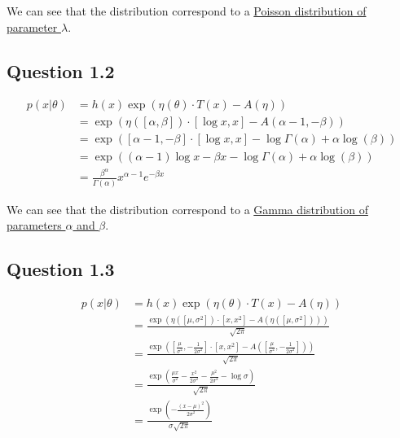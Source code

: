 \documentclass{article}
\begin{document}
We can see that the distribution correspond to a \underline{Poisson distribution of parameter $\lambda$}.

\subsection*{Question 1.2}

\begin{equation}
    \begin{split}
        p(x|\theta) & = h(x) \exp(\eta(\theta) \cdot T(x) - A(\eta))                                            \\
                    & = \exp(\eta([\alpha, \beta]) \cdot [\log x, x] - A(\alpha - 1, -\beta))                   \\
                    & = \exp([\alpha - 1, -\beta] \cdot [\log x, x] - \log \Gamma(\alpha) + \alpha \log(\beta)) \\
                    & = \exp((\alpha - 1) \log x - \beta x - \log \Gamma(\alpha) + \alpha \log(\beta))          \\
                    & = \frac{\beta^\alpha}{\Gamma(\alpha)} x^{\alpha - 1} e^{-\beta x}
    \end{split}
\end{equation}

We can see that the distribution correspond to a \underline{Gamma distribution of parameters $\alpha$ and $\beta$}.

\subsection*{Question 1.3}

\begin{equation}
    \begin{split}
        p(x|\theta) & = h(x) \exp(\eta(\theta) \cdot T(x) - A(\eta))                                                                                                 \\
                    & = \frac{\exp(\eta([\mu, \sigma^2]) \cdot [x, x^2] - A(\eta([\mu, \sigma^2])))}{\sqrt{2 \pi}}                                                   \\
                    & = \frac{\exp([\frac{\mu}{\sigma^2}, - \frac{1}{2 \sigma^2}] \cdot [x, x^2] - A([\frac{\mu}{\sigma^2}, - \frac{1}{2 \sigma^2}]))}{\sqrt{2 \pi}} \\
                    & = \frac{\exp(\frac{\mu x}{\sigma^2} - \frac{x^2}{2 \sigma^2} - \frac{\mu^2}{2 \sigma^2} - \log \sigma)}{\sqrt{2 \pi}}                          \\
                    & = \frac{\exp(- \frac{(x - \mu)^2}{2 \sigma^2})}{\sigma \sqrt{2 \pi}}
    \end{split}
\end{equation}
\end{document}
